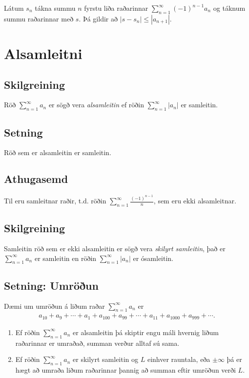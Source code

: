 \documentclass[b5paper,11pt,icelandic]{sphinxmanual}
\begin{document}
Látum \(s_n\) tákna summu \(n\) fyrstu liða raðarinnar
\(\sum_{n=1}^\infty (-1)^{n-1}a_n\) og táknum summu raðarinnar með
\(s\). Þá gildir að \(|s-s_n|\leq |a_{n+1}|\).


\section{Alsamleitni}
\label{kafli09:alsamleitni}\label{kafli09:index-10}

\subsection{Skilgreining}
\label{kafli09:id12}
Röð \(\sum_{n=1}^\infty a_n\) er sögð vera \emph{alsamleitin} ef röðin
\(\sum_{n=1}^\infty |a_n|\) er samleitin.


\subsection{Setning}
\label{kafli09:id13}
Röð sem er alsamleitin er samleitin.


\subsection{Athugasemd}
\label{kafli09:id14}
Til eru samleitnar raðir, t.d. röðin
\(\sum_{n=1}^\infty \frac{(-1)^{n-1}}{n}\), sem eru ekki
alsamleitnar.


\subsection{Skilgreining}
\label{kafli09:index-11}\label{kafli09:id15}
Samleitin röð sem er ekki alsamleitin er sögð vera
\emph{skilyrt samleitin}, það er \(\sum_{n=1}^\infty a_n\) er samleitin
en röðin \(\sum_{n=1}^\infty |a_n|\) er ósamleitin.


\subsection{Setning: Umröðun}
\label{kafli09:setning-umroun}
Dæmi um umröðun á liðum raðar \(\sum_{n=1}^\infty a_n\) er
\begin{equation*}
\begin{split}a_{10}+a_9+\cdots+a_1+a_{100}+a_{99}+\cdots+a_{11}+
a_{1000}+a_{999}+\cdots.\end{split}
\end{equation*}\begin{enumerate}
\item {} 
Ef röðin \(\sum_{n=1}^\infty a_n\) er alsamleitin þá skiptir
engu máli hvernig liðum raðarinnar er umraðað, summan verður alltaf
sú sama.

\item {} 
Ef röðin \(\sum_{n=1}^\infty a_n\) er skilyrt samleitin og
\(L\) einhver rauntala, eða \(\pm\infty\) þá er hægt að
umraða liðum raðarinnar þannig að summan eftir umröðun verði
\(L\).

\end{enumerate}
\end{document}
